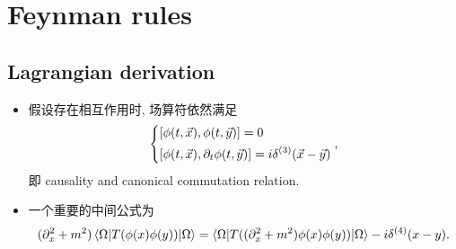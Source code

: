 \chapter{Feynman rules}
\section{Lagrangian derivation}
\begin{itemize}
	\item 假设存在相互作用时, 场算符依然满足
	\begin{equation}
		\begin{dcases}
			[\phi(t, \vec{x}), \phi(t, \vec{y})] = 0 \\
			[\phi(t, \vec{x}), \partial_t \phi(t, \vec{y})] = i \delta^{(3)}(\vec{x} - \vec{y})
		\end{dcases},
	\end{equation}
	即 causality and canonical commutation relation.
	
	\item 一个重要的中间公式为
	\begin{equation} \label{Feynman rules.1.2}
		(\partial_x^2 + m^2) \braket{\Omega | T(\phi(x) \phi(y)) | \Omega} = \braket{\Omega | T((\partial_x^2 + m^2) \phi(x) \phi(y)) | \Omega} - i \delta^{(4)}(x - y).
	\end{equation}
	

\end{itemize}
